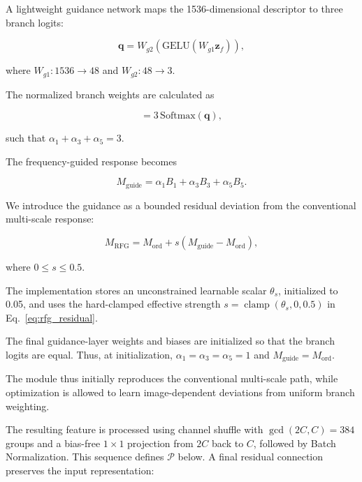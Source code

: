 A lightweight guidance network maps the 1536-dimensional descriptor to three branch logits:

\begin{equation}
\mathbf{q}
=
W_{g2}
\left(
\mathrm{GELU}
\left(
W_{g1}\mathbf{z}_f
\right)
\right),
\label{eq:rfg_logits}
\end{equation}

where $W_{g1}:1536\rightarrow48$ and $W_{g2}:48\rightarrow3$.

The normalized branch weights are calculated as

\begin{equation}
[\alpha_1,\alpha_3,\alpha_5]
=
3\,\mathrm{Softmax}(\mathbf{q}),
\label{eq:rfg_weights}
\end{equation}

such that $\alpha_1+\alpha_3+\alpha_5=3$.

The frequency-guided response becomes

\begin{equation}
M_{\mathrm{guide}}
=
\alpha_1B_1+
\alpha_3B_3+
\alpha_5B_5.
\label{eq:rfg_guided_aggregation}
\end{equation}

We introduce the guidance as a bounded residual deviation from the conventional multi-scale response:

\begin{equation}
M_{\mathrm{RFG}}
=
M_{\mathrm{ord}}
+
s
\left(
M_{\mathrm{guide}}-M_{\mathrm{ord}}
\right),
\label{eq:rfg_residual}
\end{equation}

where $0\leq s\leq0.5$.

The implementation stores an unconstrained learnable scalar $\theta_s$, initialized to
0.05, and uses the hard-clamped effective strength
$s=\operatorname{clamp}(\theta_s,0,0.5)$ in Eq.~\eqref{eq:rfg_residual}.

The final guidance-layer weights and biases are initialized so that the branch logits are equal. Thus, at initialization, $\alpha_1=\alpha_3=\alpha_5=1$ and $M_{\mathrm{guide}}=M_{\mathrm{ord}}$.

The module thus initially reproduces the conventional multi-scale path, while optimization is allowed to learn image-dependent deviations from uniform branch weighting.

The resulting feature is processed using channel shuffle with
$\gcd(2C,C)=384$ groups and a bias-free $1\times1$ projection from $2C$ back to
$C$, followed by Batch Normalization. This sequence defines $\mathcal P$ below. A
final residual connection preserves the input representation:

